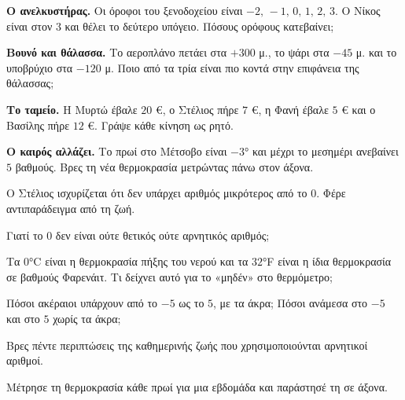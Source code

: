 \ex \textbf{Ο ανελκυστήρας.} Οι όροφοι του ξενοδοχείου είναι $-2,\,-1,\,0,\,1,\,2,\,3$. Ο Νίκος είναι στον $3$ και θέλει το δεύτερο υπόγειο. Πόσους ορόφους κατεβαίνει;

\ex \textbf{Βουνό και θάλασσα.} Το αεροπλάνο πετάει στα $+300$ μ., το ψάρι στα $-45$ μ. και το υποβρύχιο στα $-120$ μ. Ποιο από τα τρία είναι πιο κοντά στην επιφάνεια της θάλασσας;

\ex \textbf{Το ταμείο.} Η Μυρτώ έβαλε $20$ €, ο Στέλιος πήρε $7$ €, η Φανή έβαλε $5$ € και ο Βασίλης πήρε $12$ €. Γράψε κάθε κίνηση ως ρητό.

\ex \textbf{Ο καιρός αλλάζει.} Το πρωί στο Μέτσοβο είναι $-3$° και μέχρι το μεσημέρι ανεβαίνει $5$ βαθμούς. Βρες τη νέα θερμοκρασία μετρώντας πάνω στον άξονα.


\ex Ο Στέλιος ισχυρίζεται ότι δεν υπάρχει αριθμός μικρότερος από το $0$. Φέρε αντιπαράδειγμα από τη ζωή.

\ex Γιατί το $0$ δεν είναι ούτε θετικός ούτε αρνητικός αριθμός;

\ex Τα $0$°C είναι η θερμοκρασία πήξης του νερού και τα $32$°F είναι η ίδια θερμοκρασία σε βαθμούς Φαρενάιτ. Τι δείχνει αυτό για το «μηδέν» στο θερμόμετρο;

\ex Πόσοι ακέραιοι υπάρχουν από το $-5$ ως το $5$, με τα άκρα; Πόσοι ανάμεσα στο $-5$ και στο $5$ χωρίς τα άκρα;


\ex Βρες πέντε περιπτώσεις της καθημερινής ζωής που χρησιμοποιούνται αρνητικοί αριθμοί.

\ex Μέτρησε τη θερμοκρασία κάθε πρωί για μια εβδομάδα και παράστησέ τη σε άξονα.
